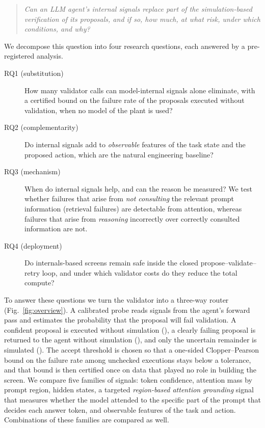\begin{quote}
\emph{Can an LLM agent's internal signals replace part of the simulation-based verification of its proposals,
and if so, how much, at what risk, under which conditions, and why?}
\end{quote}

We decompose this question into four research questions, each answered by a pre-registered analysis.
\begin{description}
\item[RQ1 (substitution)] How many validator calls can model-internal signals alone eliminate, with a certified
bound on the failure rate of the proposals executed without validation, when no model of the plant is used?
\item[RQ2 (complementarity)] Do internal signals add to \emph{observable} features of the task state and the
proposed action, which are the natural engineering baseline?
\item[RQ3 (mechanism)] When do internal signals help, and can the reason be measured? We test whether failures
that arise from \emph{not consulting} the relevant prompt information (retrieval failures) are detectable from
attention, whereas failures that arise from \emph{reasoning} incorrectly over correctly consulted information
are not.
\item[RQ4 (deployment)] Do internals-based screens remain safe inside the closed propose--validate--retry loop,
and under which validator costs do they reduce the total compute?
\end{description}

To answer these questions we turn the validator into a three-way router (Fig.~\ref{fig:overview}). A calibrated
probe reads signals from the agent's forward pass and estimates the probability that the proposal will fail
validation. A confident proposal is executed without simulation (\ACC), a clearly failing proposal is returned
to the agent without simulation (\REJ), and only the uncertain remainder is simulated (\VAL). The accept
threshold is chosen so that a one-sided Clopper--Pearson bound \citep{clopper1934} on the failure rate among
unchecked executions stays below a tolerance, and that bound is then certified once on data that played no
role in building the screen. We compare five families of signals: token confidence, attention mass by prompt
region, hidden states, a targeted \emph{region-based attention grounding} signal that measures whether the model
attended to the specific part of the prompt that decides each answer token, and observable features of the
task and action. Combinations of these families are compared as well.

